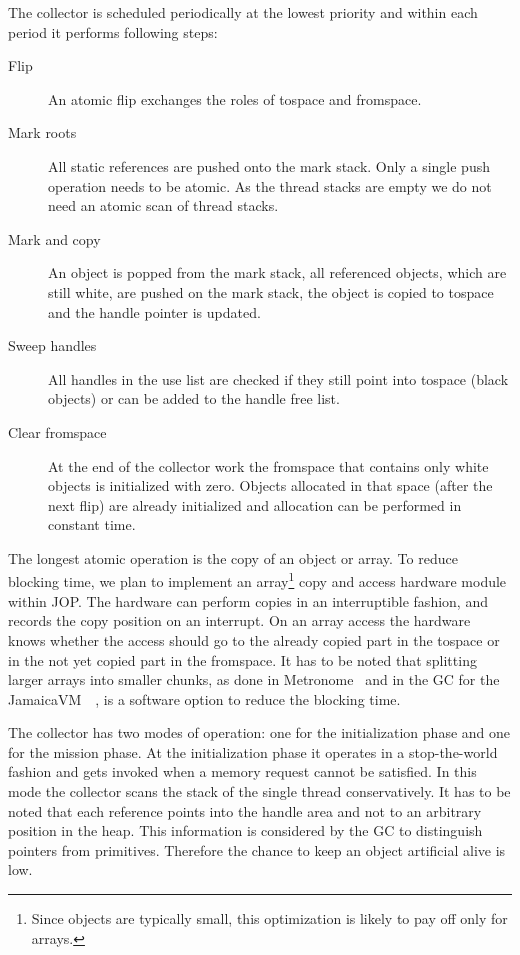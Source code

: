 The collector is scheduled periodically at the lowest priority and
within each period it performs following steps:
\begin{description}
    \item[Flip] An atomic flip exchanges the roles of tospace and
    fromspace.
    \item[Mark roots] All static references are pushed onto the mark
    stack. Only a single push operation needs to be atomic. As the
    thread stacks are empty we do not need an atomic scan of thread
    stacks.
    \item[Mark and copy] An object is popped from the mark stack,
    all referenced objects, which are still white, are pushed on the
    mark stack, the object is copied to tospace and the handle
    pointer is updated.
    \item[Sweep handles] All handles in the use list are checked if
    they still point into tospace (black objects) or can be added to
    the handle free list.
    \item[Clear fromspace] At the end of the collector work the
    fromspace that contains only white objects is initialized with
    zero. Objects allocated in that space (after the next flip) are
    already initialized and allocation can be performed in constant
    time.
\end{description}
%
The longest atomic operation is the copy of an object or array.  To
reduce blocking time, we plan to implement an array\footnote{Since
objects are typically small, this optimization is likely to pay off
only for arrays.} copy and access hardware module within JOP. The
hardware can perform copies in an interruptible fashion, and records
the copy position on an interrupt. On an array access the hardware
knows whether the access should go to the already copied part in the
tospace or in the not yet copied part in the fromspace. It has to be
noted that splitting larger arrays into smaller chunks, as done in
Metronome~\cite{gc:bacon03} and in the GC for the
JamaicaVM~~\cite{gc:siebert:phd}, is a software option to reduce the
blocking time.

The collector has two modes of operation: one for the initialization
phase and one for the mission phase. At the initialization phase it
operates in a stop-the-world fashion and gets invoked when a memory
request cannot be satisfied. In this mode the collector scans the
stack of the single thread conservatively. It has to be noted that
each reference points into the handle area and not to an arbitrary
position in the heap. This information is considered by the GC to
distinguish pointers from primitives. Therefore the chance to keep
an object artificial alive is low.

